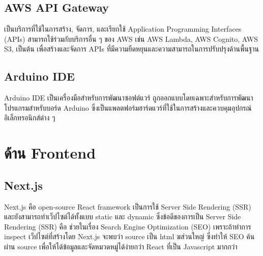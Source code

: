 \subsection{AWS API Gateway}
เป็นบริการที่ใช้ในการสร้าง, จัดการ, และเรียกใช้ Application Programming Interfaces (APIs) สามารถใช้ร่วมกับบริการอื่น ๆ ของ AWS เช่น AWS Lambda, AWS Cognito, AWS S3, เป็นต้น เพื่อสร้างและจัดการ APIs ที่มีความยืดหยุนและความสามารถในการปรับปรุงด้านพื้นฐาน

\subsection{Arduino IDE}
Arduino IDE เป็นเครื่องมือสำหรับการพัฒนาซอฟต์แวร์ ถูกออกแบบโดยเฉพาะสำหรับการพัฒนาโปรแกรมสำหรับบอร์ด Arduino ซึ่งเป็นแพลตฟอร์มฮาร์ดแวร์ที่ใช้ในการสร้างและควบคุมอุปกรณ์อิเล็กทรอนิกส์ต่าง ๆ



\section{ด้าน Frontend}

\subsection{Next.js}
Next.js คือ open-source React framework เป็นการใช้ Server Side Rendering (SSR) และยังสามารถทำเว็ปไซต์ได้ทั้งแบบ static และ dynamic 
\enskip
ซึ่งข้อดีของการเป็น Server Side Rendering (SSR) คือ ช่วยในเรื่อง Search Engine Optimization (SEO) เพราะถ้าทำการ inspect เว็ปไซต์ที่สร้างโดย Next.js จะพบว่า source เป็น html ฆส่วนใหญ่ ซึ่งทำให้ SEO ค้นผ่าน source เพื่อให้ได้ข้อมูลและจัดหมวดหมู่ได้ง่ายกว่า React ที่เป็น Javascript มากกว่า

